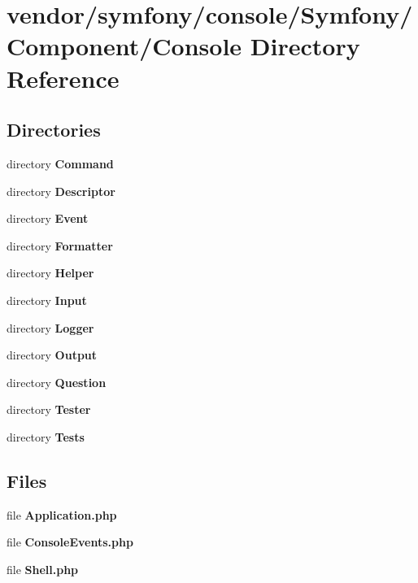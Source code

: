 \section{vendor/symfony/console/\+Symfony/\+Component/\+Console Directory Reference}
\label{dir_12a8145ef487a34daa3988dbfcbc283c}
\subsection*{Directories}
\begin{DoxyCompactItemize}
\item 
directory {\bf Command}
\item 
directory {\bf Descriptor}
\item 
directory {\bf Event}
\item 
directory {\bf Formatter}
\item 
directory {\bf Helper}
\item 
directory {\bf Input}
\item 
directory {\bf Logger}
\item 
directory {\bf Output}
\item 
directory {\bf Question}
\item 
directory {\bf Tester}
\item 
directory {\bf Tests}
\end{DoxyCompactItemize}
\subsection*{Files}
\begin{DoxyCompactItemize}
\item 
file {\bf Application.\+php}
\item 
file {\bf Console\+Events.\+php}
\item 
file {\bf Shell.\+php}
\end{DoxyCompactItemize}
